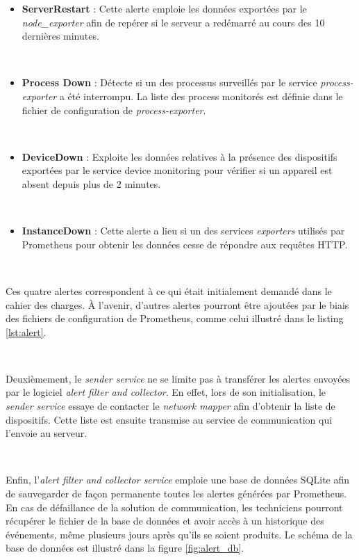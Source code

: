 \begin{itemize}
  \item \textbf{ServerRestart} : Cette alerte emploie les données exportées par le \textit{node\_exporter} afin de repérer si le serveur a redémarré au cours des 10 dernières minutes.

  ~

  \item \textbf{Process Down} : Détecte si un des processus surveillés par le service \textit{process-exporter} a été interrompu. La liste des process monitorés est définie dans le fichier de configuration de \textit{process-exporter}.

  ~

  \item \textbf{DeviceDown} : Exploite les données relatives à la présence des dispositifs exportées par le service device monitoring pour vérifier si un appareil est absent depuis plus de 2 minutes.

    ~

  \item \textbf{InstanceDown} : Cette alerte a lieu si un des services \textit{exporters} utilisés par Prometheus pour obtenir les données cesse de répondre aux requêtes HTTP.
\end{itemize}

~

\noindent
Ces quatre alertes correspondent à ce qui était initialement demandé dans le cahier des charges. À l'avenir, d'autres alertes pourront être ajoutées par le biais des fichiers de configuration de Prometheus, comme celui illustré dans le listing \ref{lst:alert}.

~

\noindent
Deuxièmement, le \textit{sender service} ne se limite pas à transférer les alertes envoyées par le logiciel \textit{alert filter and collector}. En effet, lors de son initialisation, le \textit{sender service} essaye de contacter le \textit{network mapper} afin d'obtenir la liste de dispositifs. Cette liste est ensuite transmise au service de communication qui l'envoie au serveur.

~

\noindent
Enfin, l'\textit{alert filter and collector service} emploie une base de données SQLite afin de sauvegarder de façon permanente toutes les alertes générées par Prometheus. En cas de défaillance de la solution de communication, les techniciens pourront récupérer le fichier de la base de données et avoir accès à un historique des événements, même plusieurs jours après qu'ils se soient produits. Le schéma de la base de données est illustré dans la figure \ref{fig:alert_db}.



